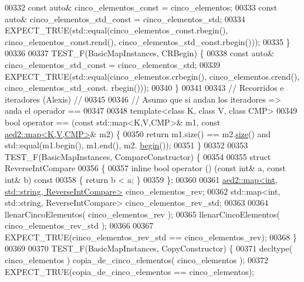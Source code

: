 \begin{DoxyCode}
00332     \textcolor{keyword}{const} \textcolor{keyword}{auto}& cinco\_elementos\_const = cinco\_elementos;
00333     \textcolor{keyword}{const} \textcolor{keyword}{auto}& cinco\_elementos\_std\_const = cinco\_elementos\_std;
00334     EXPECT\_TRUE(std::equal(cinco\_elementos\_const.rbegin(), cinco\_elementos\_const.rend(), 
      cinco\_elementos\_std\_const.rbegin()));
00335 \}
00336 
00337 TEST\_F(BasicMapInstances, CRBegin) \{
00338     \textcolor{keyword}{const} \textcolor{keyword}{auto}& cinco\_elementos\_std\_const = cinco\_elementos\_std;
00339     EXPECT\_TRUE(std::equal(cinco\_elementos.crbegin(), cinco\_elementos.crend(), cinco\_elementos\_std\_const.
      rbegin()));
00340 \}
00341 
00343 \textcolor{comment}{// Recorridos e iteradores (Alexis) //}
00345 \textcolor{comment}{}
00346 \textcolor{comment}{// Asumo que si andan los iteradores => anda el operador ==}
00347 
00348 \textcolor{keyword}{template}<\textcolor{keyword}{class} K, \textcolor{keyword}{class} V, \textcolor{keyword}{class} CMP>
00349 \textcolor{keywordtype}{bool} operator == (\textcolor{keyword}{const} std::map<K,V,CMP>& m1, \textcolor{keyword}{const} \hyperlink{classaed2_1_1map}{aed2::map<K,V,CMP>}& m2) \{
00350     \textcolor{keywordflow}{return} m1.size() == m2.\hyperlink{classaed2_1_1map_a89f2613f926ac13293eafe65889d6021_a89f2613f926ac13293eafe65889d6021}{size}() and std::equal(m1.begin(), m1.end(), m2.
      \hyperlink{classaed2_1_1map_a58a95705d54b3dda7f775ce5a22225cb_a58a95705d54b3dda7f775ce5a22225cb}{begin}());
00351 \}
00352 
00353 TEST\_F(BasicMapInstances, CompareConstructor) \{
00354 
00355     \textcolor{keyword}{struct }ReverseIntCompare
00356     \{
00357         \textcolor{keyword}{inline} \textcolor{keywordtype}{bool} operator () (\textcolor{keyword}{const} \textcolor{keywordtype}{int}& a, \textcolor{keyword}{const} \textcolor{keywordtype}{int}& b)\textcolor{keyword}{ const}
00358 \textcolor{keyword}{        }\{ \textcolor{keywordflow}{return} b < a; \}
00359     \};
00360 
00361     \hyperlink{classaed2_1_1map}{aed2::map<int, std::string, ReverseIntCompare>} 
      cinco\_elementos\_rev;
00362     std::map<int, std::string, ReverseIntCompare> cinco\_elementos\_rev\_std;
00363 
00364     llenarCincoElementos( cinco\_elementos\_rev );
00365     llenarCincoElementos( cinco\_elementos\_rev\_std );
00366 
00367     EXPECT\_TRUE(cinco\_elementos\_rev\_std == cinco\_elementos\_rev);
00368 \}
00369 
00370 TEST\_F(BasicMapInstances, CopyConstructor) \{
00371     decltype( cinco\_elementos ) copia\_de\_cinco\_elementos( cinco\_elementos );
00372     EXPECT\_TRUE(copia\_de\_cinco\_elementos == cinco\_elementos);

\end{DoxyCode}
